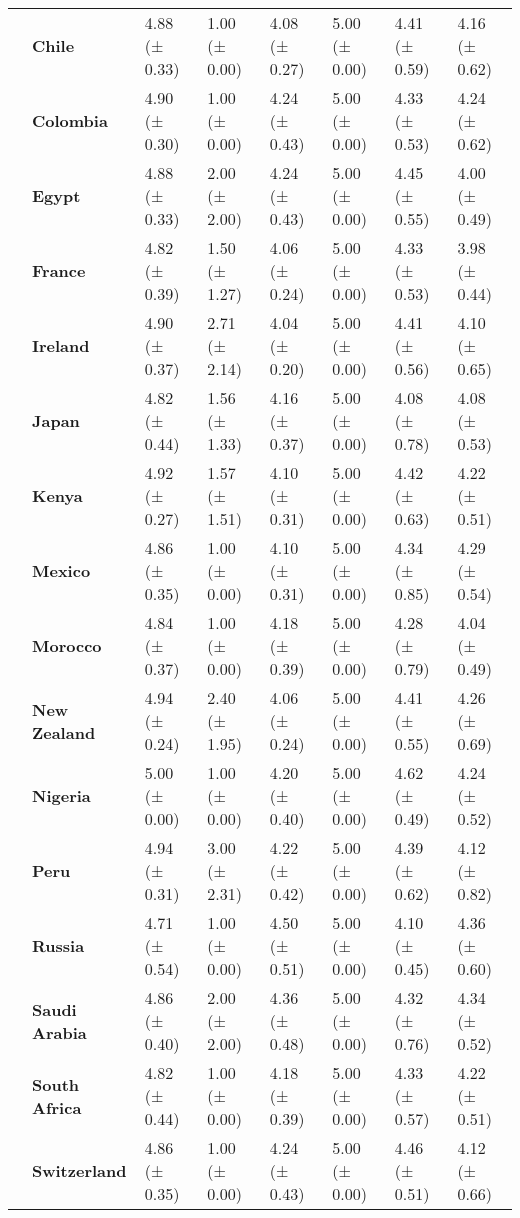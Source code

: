\begin{tabular}{llllllll}
\textbf{} & \textbf{Chile} & 4.88 (± 0.33) & 1.00 (± 0.00) & 4.08 (± 0.27) & 5.00 (± 0.00) & 4.41 (± 0.59) & 4.16 (± 0.62) \\
\textbf{} & \textbf{Colombia} & 4.90 (± 0.30) & 1.00 (± 0.00) & 4.24 (± 0.43) & 5.00 (± 0.00) & 4.33 (± 0.53) & 4.24 (± 0.62) \\
\textbf{} & \textbf{Egypt} & 4.88 (± 0.33) & 2.00 (± 2.00) & 4.24 (± 0.43) & 5.00 (± 0.00) & 4.45 (± 0.55) & 4.00 (± 0.49) \\
\textbf{} & \textbf{France} & 4.82 (± 0.39) & 1.50 (± 1.27) & 4.06 (± 0.24) & 5.00 (± 0.00) & 4.33 (± 0.53) & 3.98 (± 0.44) \\
\textbf{} & \textbf{Ireland} & 4.90 (± 0.37) & 2.71 (± 2.14) & 4.04 (± 0.20) & 5.00 (± 0.00) & 4.41 (± 0.56) & 4.10 (± 0.65) \\
\textbf{} & \textbf{Japan} & 4.82 (± 0.44) & 1.56 (± 1.33) & 4.16 (± 0.37) & 5.00 (± 0.00) & 4.08 (± 0.78) & 4.08 (± 0.53) \\
\textbf{} & \textbf{Kenya} & 4.92 (± 0.27) & 1.57 (± 1.51) & 4.10 (± 0.31) & 5.00 (± 0.00) & 4.42 (± 0.63) & 4.22 (± 0.51) \\
\textbf{} & \textbf{Mexico} & 4.86 (± 0.35) & 1.00 (± 0.00) & 4.10 (± 0.31) & 5.00 (± 0.00) & 4.34 (± 0.85) & 4.29 (± 0.54) \\
\textbf{} & \textbf{Morocco} & 4.84 (± 0.37) & 1.00 (± 0.00) & 4.18 (± 0.39) & 5.00 (± 0.00) & 4.28 (± 0.79) & 4.04 (± 0.49) \\
\textbf{} & \textbf{New Zealand} & 4.94 (± 0.24) & 2.40 (± 1.95) & 4.06 (± 0.24) & 5.00 (± 0.00) & 4.41 (± 0.55) & 4.26 (± 0.69) \\
\textbf{} & \textbf{Nigeria} & 5.00 (± 0.00) & 1.00 (± 0.00) & 4.20 (± 0.40) & 5.00 (± 0.00) & 4.62 (± 0.49) & 4.24 (± 0.52) \\
\textbf{} & \textbf{Peru} & 4.94 (± 0.31) & 3.00 (± 2.31) & 4.22 (± 0.42) & 5.00 (± 0.00) & 4.39 (± 0.62) & 4.12 (± 0.82) \\
\textbf{} & \textbf{Russia} & 4.71 (± 0.54) & 1.00 (± 0.00) & 4.50 (± 0.51) & 5.00 (± 0.00) & 4.10 (± 0.45) & 4.36 (± 0.60) \\
\textbf{} & \textbf{Saudi Arabia} & 4.86 (± 0.40) & 2.00 (± 2.00) & 4.36 (± 0.48) & 5.00 (± 0.00) & 4.32 (± 0.76) & 4.34 (± 0.52) \\
\textbf{} & \textbf{South Africa} & 4.82 (± 0.44) & 1.00 (± 0.00) & 4.18 (± 0.39) & 5.00 (± 0.00) & 4.33 (± 0.57) & 4.22 (± 0.51) \\
\textbf{} & \textbf{Switzerland} & 4.86 (± 0.35) & 1.00 (± 0.00) & 4.24 (± 0.43) & 5.00 (± 0.00) & 4.46 (± 0.51) & 4.12 (± 0.66) \\

\end{tabular}
